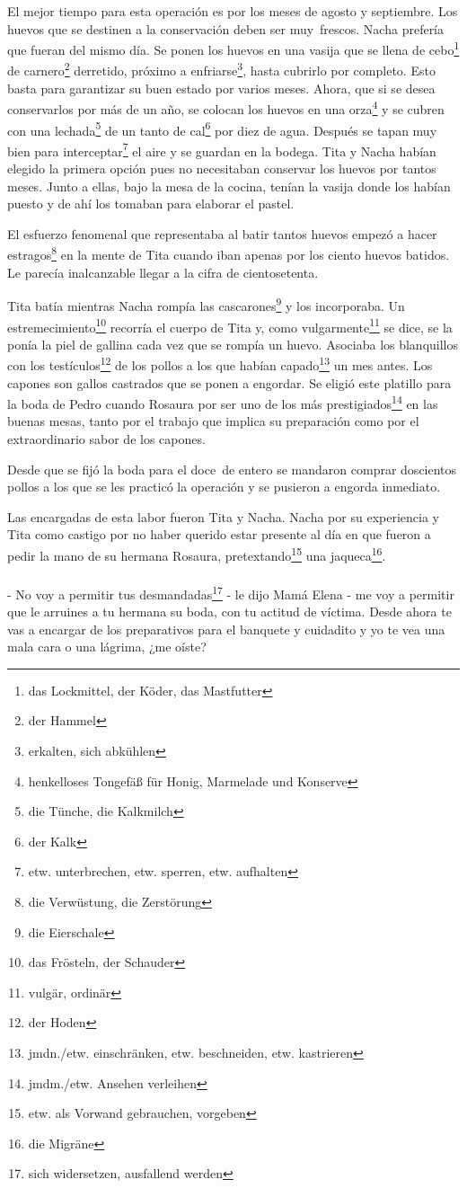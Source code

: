 El mejor tiempo para esta operación es por los meses de agosto y septiembre.
Los huevos que se destinen a la conservación deben ser muy~frescos.
Nacha prefería que fueran del mismo día. Se ponen los huevos en una vasija
que se llena de cebo\footnote{das Lockmittel, der Köder, das Mastfutter}
de carnero\footnote{der Hammel} derretido, próximo a enfriarse\footnote{erkalten, sich abkühlen}, hasta cubrirlo por
completo. Esto basta para garantizar su buen estado por varios meses.
Ahora, que si se desea conservarlos por más de un año, se colocan los
huevos en una orza\footnote{henkelloses Tongefäß für Honig, Marmelade und Konserve}
y se cubren con una lechada\footnote{die Tünche, die Kalkmilch} de un tanto de cal\footnote{der Kalk} por diez de agua. Después se tapan muy bien
para interceptar\footnote{etw. unterbrechen, etw. sperren, etw. aufhalten}
el aire y se guardan en la bodega. Tita y Nacha habían elegido la primera
opción pues no necesitaban conservar los huevos por tantos meses. Junto
a ellas, bajo la mesa de la cocina, tenían la vasija donde los habían
puesto y de ahí los tomaban para elaborar el pastel.

El esfuerzo fenomenal que representaba al batir tantos huevos empezó a
hacer estragos\footnote{die Verwüstung, die Zerstörung} en la
mente de Tita cuando iban apenas por los ciento huevos batidos. Le
parecía inalcanzable llegar a la cifra de cientosetenta.

Tita batía mientras Nacha rompía las cascarones\footnote{die Eierschale}
y los incorporaba. Un estremecimiento\footnote{das Frösteln, der Schauder}
recorría el cuerpo de Tita y, como vulgarmente\footnote{vulgär, ordinär}
se dice, se la ponía la piel de gallina cada vez que se rompía un huevo.
Asociaba los blanquillos con los testículos\footnote{der Hoden}
de los pollos a los que habían capado\footnote{jmdn./etw. einschränken, etw. beschneiden, etw. kastrieren}
un mes antes. Los capones son gallos castrados que se ponen a engordar.
Se eligió este platillo para la boda de Pedro cuando Rosaura por ser uno
de los más prestigiados\footnote{jmdm./etw. Ansehen verleihen}
en las buenas mesas, tanto por el trabajo que implica su preparación
como por el extraordinario sabor de los capones.

Desde que se fijó la boda para el doce~de entero se mandaron
comprar doscientos pollos a los que se les practicó la operación
y se pusieron a engorda inmediato.

Las encargadas de esta labor fueron Tita y Nacha. Nacha por su
experiencia y Tita como castigo por no haber querido estar presente al
día en que fueron a pedir la mano de su hermana Rosaura, pretextando\footnote{etw. als Vorwand gebrauchen, vorgeben} una jaqueca\footnote{die Migräne}.
\\
\\- No voy a permitir tus desmandadas\footnote{sich widersetzen, ausfallend werden} - le %
dijo Mamá Elena - me voy a permitir que le arruines a tu hermana su %
boda, con tu actitud de víctima. Desde ahora te vas a encargar de los %
preparativos para el banquete y cuidadito y yo te vea una mala cara o %
una lágrima, ¿me oíste?\\

